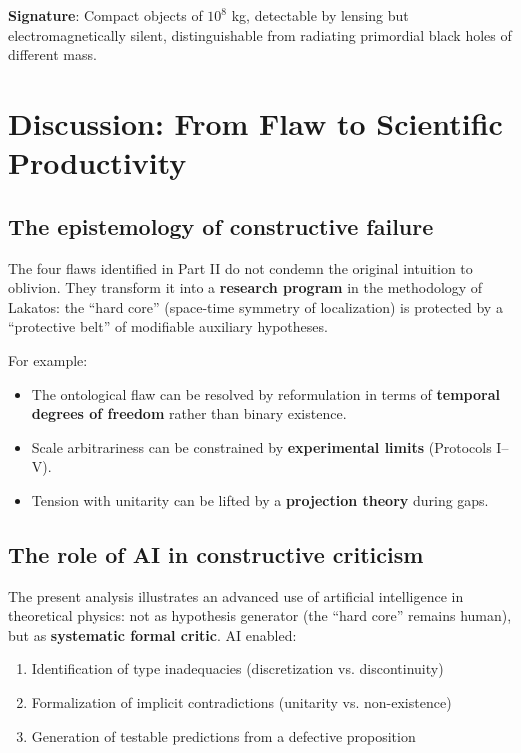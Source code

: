 \documentclass[11pt,a4paper]{article}
\begin{document}
\textbf{Signature}: Compact objects of $10^8$ kg, detectable by lensing but electromagnetically silent, distinguishable from radiating primordial black holes of different mass.

\section{Discussion: From Flaw to Scientific Productivity}

\subsection{The epistemology of constructive failure}

The four flaws identified in Part II do not condemn the original intuition to oblivion. They transform it into a \textbf{research program} in the methodology of Lakatos: the ``hard core'' (space-time symmetry of localization) is protected by a ``protective belt'' of modifiable auxiliary hypotheses.

For example:
\begin{itemize}
    \item The ontological flaw can be resolved by reformulation in terms of \textbf{temporal degrees of freedom} rather than binary existence.
    \item Scale arbitrariness can be constrained by \textbf{experimental limits} (Protocols I--V).
    \item Tension with unitarity can be lifted by a \textbf{projection theory} during gaps.
\end{itemize}

\subsection{The role of AI in constructive criticism}

The present analysis illustrates an advanced use of artificial intelligence in theoretical physics: not as hypothesis generator (the ``hard core'' remains human), but as \textbf{systematic formal critic}. AI enabled:
\begin{enumerate}
    \item Identification of type inadequacies (discretization vs. discontinuity)
    \item Formalization of implicit contradictions (unitarity vs. non-existence)
    \item Generation of testable predictions from a defective proposition
\end{enumerate}
\end{document}
